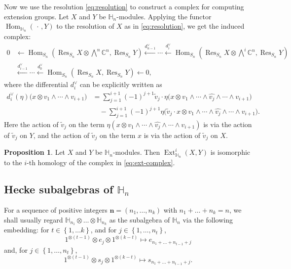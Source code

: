 \documentclass[11pt]{amsart}
\numberwithin{equation}{section}
\theoremstyle{definition}
\newtheorem{proposition}[thm]{Proposition}
\newcommand{\Ext}{\operatorname{Ext}}
\newcommand{\Hom}{\operatorname{Hom}}
\newcommand{\Res}{\operatorname{Res}}
\begin{document}
Now we use the resolution \eqref{eq:resolution} to construct a complex for computing 
extension groups. Let $X$ and $Y$ be $\mathbb{H}_{n}$-modules. Applying the functor $\Hom_{\mathbb{H}_{n}}(\,\cdot\,,Y)$  to the resolution of $X$ as in \eqref{eq:resolution}, we get the induced complex:
\begin{equation}\label{eq:ext-complex}
\begin{aligned}
0&\longleftarrow
\Hom_{S_n}(\Res_{S_n} X\otimes\textstyle\bigwedge^n\mathbb{C}^{n},\Res_{S_{n}} Y)
\xleftarrow{d_{n-1}^\vee}\cdots
\xleftarrow{d_{i}^\vee}
\Hom_{S_n}(\Res_{S_n} X\otimes\textstyle\bigwedge^i\mathbb{C}^{n},\Res_{S_{n}} Y)
\\
&\xleftarrow{d_{i-1}^\vee}\cdots
\xleftarrow{d_{0}^\vee}
\Hom_{S_n}(\Res_{S_n} X,\Res_{S_n} Y)\longleftarrow0,
\end{aligned}
\end{equation}
where the differential $d_{i}^\vee$ can be explicitly written as
\begin{align*}
d_{i}^\vee(\eta)
\bigl(x\otimes v_1\wedge\cdots\wedge v_{i+1}\bigr)
&=
\sum_{j=1}^{i+1}(-1)^{j+1}\widetilde v_j\cdot
\eta\bigl(x\otimes
v_1\wedge\cdots\wedge\widehat{v_j}\wedge\cdots\wedge v_{i+1}\bigr)
\\
&\quad-
\sum_{j=1}^{i+1}(-1)^{j+1}
\eta\bigl(\widetilde v_j\cdot x\otimes
v_1\wedge\cdots\wedge\widehat{v_j}\wedge\cdots\wedge v_{i+1}\bigr).
\end{align*}
Here the action of $\widetilde v_j$ on the term
$\eta(x\otimes v_1\wedge\cdots\wedge\widehat{v_j}\wedge\cdots\wedge
v_{i+1})$ is via the action of $\widetilde v_j$ on $Y$, and the action of $\widetilde v_j$ on the term $x$ is via the action of $\widetilde v_j$ on $X$.

\begin{proposition}\cite[Proposition 3.7]{chan2016duality}
Let $X$ and $Y$ be $\mathbb{H}_{n}$-modules. Then $\Ext_{\mathbb{H}_{n}}^i(X,Y)$ is
isomorphic to the $i$-th homology of the complex in
\eqref{eq:ext-complex}.
\end{proposition}



\subsection{Hecke subalgebras of $\mathbb H_n$}

For a sequence of positive integers $\mathbf n=(n_1, \ldots, n_k)$ with $n_1+\ldots + n_k=n$, we shall usually regard $\mathbb H_{n_1}\otimes \ldots \otimes \mathbb H_{n_k}$ as the subalgebra of $\mathbb H_n$ via the following embedding: for $t \in \left\{ 1, \ldots k \right\}$, and for $j \in \left\{ 1, \ldots, n_t \right\}$,
\[  1^{\otimes (t-1)} \otimes e_j \otimes 1^{\otimes (k-t)} \mapsto e_{n_1+\ldots+n_{t-1}+j}
\]
and, for $j \in \left\{ 1, \ldots, n_t \right\}$,
\[ 1^{\otimes (t-1)} \otimes s_j \otimes 1^{\otimes (k-t)} \mapsto s_{n_1+\ldots +n_{t-1}+j} .
\]
\end{document}
